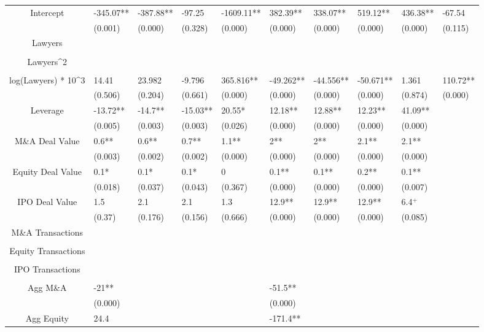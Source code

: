 \documentclass{article}
\begin{document}
\begin{table}[H]
\begin{tabular}{|clllllllll|}
Intercept & -345.07** & -387.88** & -97.25 & -1609.11** & 382.39** & 338.07** & 519.12** & 436.38** & -67.54 \\
   & (0.001) & (0.000) & (0.328) & (0.000) & (0.000) & (0.000) & (0.000) & (0.000) & (0.115) \\
  Lawyers &  &  &  &  &  &  &  &  &  \\
   &  &  &  &  &  &  &  &  &  \\
  Lawyers^2 &  &  &  &  &  &  &  &  &  \\
   &  &  &  &  &  &  &  &  &  \\
  log(Lawyers) * 10^3 & 14.41 & 23.982 & -9.796 & 365.816** & -49.262** & -44.556** & -50.671** & 1.361 & 110.72** \\
   & (0.506) & (0.204) & (0.661) & (0.000) & (0.000) & (0.000) & (0.000) & (0.874) & (0.000) \\
  Leverage & -13.72** & -14.7** & -15.03** & 20.55* & 12.18** & 12.88** & 12.23** & 41.09** &  \\
   & (0.005) & (0.003) & (0.003) & (0.026) & (0.000) & (0.000) & (0.000) & (0.000) &  \\
  M\&A Deal Value & 0.6** & 0.6** & 0.7** & 1.1** & 2** & 2** & 2.1** & 2.1** &  \\
   & (0.003) & (0.002) & (0.002) & (0.000) & (0.000) & (0.000) & (0.000) & (0.000) &  \\
  Equity Deal Value & 0.1* & 0.1* & 0.1* & 0 & 0.1** & 0.1** & 0.2** & 0.1** &  \\
   & (0.018) & (0.037) & (0.043) & (0.367) & (0.000) & (0.000) & (0.000) & (0.007) &  \\
  IPO Deal Value & 1.5 & 2.1 & 2.1 & 1.3 & 12.9** & 12.9** & 12.9** & 6.4$^{+}$ &  \\
   & (0.37) & (0.176) & (0.156) & (0.666) & (0.000) & (0.000) & (0.000) & (0.085) &  \\
  M\&A Transactions &  &  &  &  &  &  &  &  &  \\
   &  &  &  &  &  &  &  &  &  \\
  Equity Transactions &  &  &  &  &  &  &  &  &  \\
   &  &  &  &  &  &  &  &  &  \\
  IPO Transactions &  &  &  &  &  &  &  &  &  \\
   &  &  &  &  &  &  &  &  &  \\
  Agg M\&A & -21** &  &  &  & -51.5** &  &  &  &  \\
   & (0.000) &  &  &  & (0.000) &  &  &  &  \\
  Agg Equity & 24.4 &  &  &  & -171.4** &  &  &  &  \\

\end{tabular}
\end{table}
\end{document}
